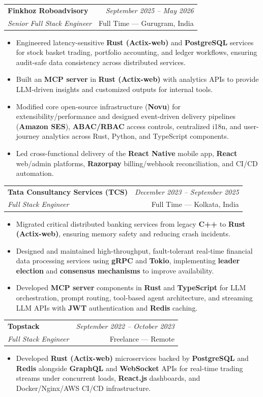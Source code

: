 \documentclass[a4paper,11pt]{article}
\makeatletter
\newcommand{\resumeSubheading}[4]{
\vspace{0.5mm}\item
    \begin{tabular*}{0.98\textwidth}[t]{l@{\extracolsep{\fill}}r}
        \textbf{#1} & \textit{\footnotesize{#4}} \\
        \textit{\footnotesize{#3}} &  \footnotesize{#2}\\
    \end{tabular*}
    \vspace{-2.4mm}
}
\newcommand{\resumeItemListStart}{\begin{itemize}[leftmargin=3ex,labelsep=1.2mm,itemsep=0.5mm]}
\newcommand{\resumeItemListEnd}{\end{itemize}\vspace{-2mm}}
\makeatother
\begin{document}
\resumeSubheading
    {Finkhoz Roboadvisory}{Full Time --- Gurugram, India}
    {Senior Full Stack Engineer}{September 2025 -- May 2026}
    \resumeItemListStart
        \item Engineered latency-sensitive \textbf{Rust (Actix-web)} and \textbf{PostgreSQL} services for stock basket trading, portfolio accounting, and ledger workflows, ensuring audit-safe data consistency across distributed services.
        \item Built an \textbf{MCP server} in \textbf{Rust (Actix-web)} with analytics APIs to provide LLM-driven insights and customized outputs for internal tools.
        \item Modified core open-source infrastructure (\textbf{Novu}) for extensibility/performance and designed event-driven delivery pipelines (\textbf{Amazon SES}), \textbf{ABAC/RBAC} access controls, centralized i18n, and user-journey analytics across Rust, Python, and TypeScript components.
        \item Led cross-functional delivery of the \textbf{React Native} mobile app, \textbf{React} web/admin platforms, \textbf{Razorpay} billing/webhook reconciliation, and CI/CD automation.
    \resumeItemListEnd

\resumeSubheading
    {Tata Consultancy Services (TCS)}{Full Time --- Kolkata, India}
    {Full Stack Engineer}{December 2023 -- September 2025}
    \resumeItemListStart
        \item Migrated critical distributed banking services from legacy \textbf{C++} to \textbf{Rust (Actix-web)}, ensuring memory safety and reducing crash incidents.
        \item Designed and maintained high-throughput, fault-tolerant real-time financial data processing services using \textbf{gRPC} and \textbf{Tokio}, implementing \textbf{leader election} and \textbf{consensus mechanisms} to improve availability.
        \item Developed \textbf{MCP server} components in \textbf{Rust} and \textbf{TypeScript} for LLM orchestration, prompt routing, tool-based agent architecture, and streaming LLM APIs with \textbf{JWT} authentication and \textbf{Redis} caching.
    \resumeItemListEnd

\resumeSubheading
    {Topstack}{Freelance --- Remote}
    {Full Stack Engineer}{September 2022 -- October 2023}
    \resumeItemListStart
        \item Developed \textbf{Rust (Actix-web)} microservices backed by \textbf{PostgreSQL} and \textbf{Redis} alongside \textbf{GraphQL} and \textbf{WebSocket} APIs for real-time trading streams under concurrent loads, \textbf{React.js} dashboards, and Docker/Nginx/AWS CI/CD infrastructure.
    \resumeItemListEnd
\end{document}
